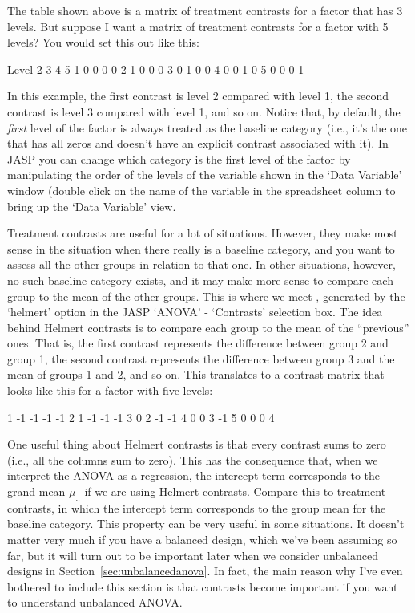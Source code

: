 The table shown above is a matrix of treatment contrasts for a factor that has 3 levels. But suppose I want a matrix of treatment contrasts for a factor with 5 levels? You would set this out like this:
\begin{rblock1}
Level   2 3 4 5
  1     0 0 0 0
  2     1 0 0 0
  3     0 1 0 0
  4     0 0 1 0
  5     0 0 0 1
\end{rblock1}
In this example, the first contrast is level 2 compared with level 1, the second contrast is level 3 compared with level 1, and so on. Notice that, by default, the {\it first} level of the factor is always treated as the baseline category (i.e., it's the one that has all zeros and doesn't have an explicit contrast associated with it). In JASP you can change which category is the first level of the factor by manipulating the order of the levels of the variable shown in the `Data Variable' window (double click on the name of the variable in the spreadsheet column to bring up the `Data Variable' view. 


Treatment contrasts are useful for a lot of situations. However, they make most sense in the situation when there really is a baseline category, and you want to assess all the other groups in relation to that one. In other situations, however, no such baseline category exists, and it may make more sense to compare each group to the mean of the other groups. This is where we meet , generated by the `helmert' option in the JASP `ANOVA' - `Contrasts' selection box. The idea behind Helmert contrasts is to compare each group to the mean of the ``previous'' ones. That is, the first contrast represents the difference between group 2 and group 1, the second contrast represents the difference between group 3 and the mean of groups 1 and 2, and so on. This translates to a contrast matrix that looks like this for a factor with five levels:
\begin{rblock1}
1   -1   -1   -1   -1
2    1   -1   -1   -1
3    0    2   -1   -1
4    0    0    3   -1
5    0    0    0    4
\end{rblock1}
One useful thing about Helmert contrasts is that every contrast sums to zero (i.e., all the columns sum to zero). This has the consequence that, when we interpret the ANOVA as a regression, the intercept term corresponds to the grand mean $\mu_{..}$ if we are using Helmert contrasts. Compare this to treatment contrasts, in which the intercept term corresponds to the group mean for the baseline category. This property can be very useful in some situations. It doesn't matter very much if you have a balanced design, which we've been assuming so far, but it will turn out to be important later when we consider unbalanced designs in Section~\ref{sec:unbalancedanova}. In fact, the main reason why I've even bothered to include this section is that contrasts become important if you want to understand unbalanced ANOVA.
 

